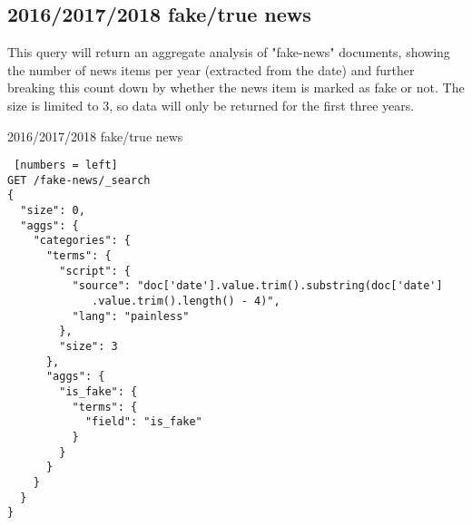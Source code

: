 \subsection{2016/2017/2018 fake/true news}
This query will return an aggregate analysis of "fake-news" documents, showing the number of news items per year (extracted from the date) and further breaking this count down by whether the news item is marked as fake or not. The size is limited to 3, so data will only be returned for the first three years.\\

\begin{algorithm}[ht]
\caption{2016/2017/2018 fake/true news}
\begin{lstlisting} [numbers = left]
GET /fake-news/_search
{
  "size": 0,
  "aggs": {
    "categories": {
      "terms": {
        "script": {
          "source": "doc['date'].value.trim().substring(doc['date']
             .value.trim().length() - 4)",
          "lang": "painless"
        },
        "size": 3
      },
      "aggs": {
        "is_fake": {
          "terms": {
            "field": "is_fake"
          }
        }
      }
    }
  }
}
\end{lstlisting}
\end{algorithm}
\newpage

